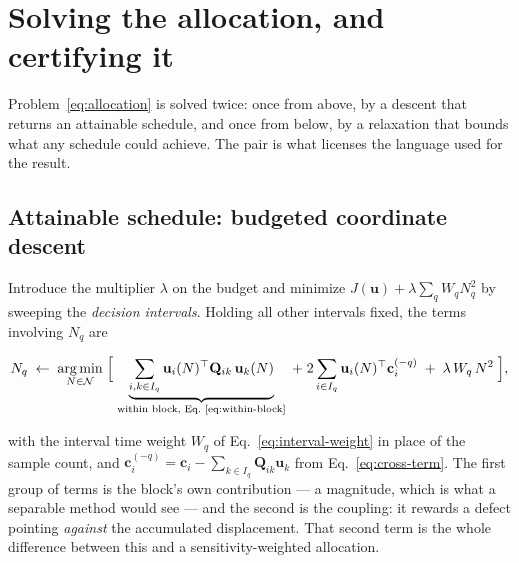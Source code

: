 \section{Solving the allocation, and certifying it}
\label{sec:algorithm}

Problem~\eqref{eq:allocation} is solved twice: once from above, by a descent
that returns an attainable schedule, and once from below, by a relaxation that
bounds what any schedule could achieve. The pair is what licenses the language
used for the result.

\subsection{Attainable schedule: budgeted coordinate descent}
\label{sec:algorithm-descent}

Introduce the multiplier $\lambda$ on the budget and minimize
$J(\mathbf u)+\lambda\sum_q W_q N_q^2$ by sweeping the \emph{decision
intervals}. Holding all other intervals fixed, the terms involving $N_q$ are

\begin{equation}
  N_q \;\leftarrow\; \operatorname*{arg\,min}_{N\in\mathcal{N}}\;
  \Bigl[\;
    \underbrace{\sum_{i,k\in I_q}\mathbf u_i(N)^{\top}\mathbf Q_{ik}\,
      \mathbf u_k(N)}_{\text{within block, Eq.~\eqref{eq:within-block}}}
    \;+\; 2\sum_{i\in I_q}\mathbf u_i(N)^{\top}\mathbf c_i^{(-q)}
    \;+\; \lambda\,W_q\,N^2
  \;\Bigr] ,
  \label{eq:coordinate-update}
\end{equation}

with the interval time weight $W_q$ of Eq.~\eqref{eq:interval-weight} in place
of the sample count, and
$\mathbf c_i^{(-q)}=\mathbf c_i-\sum_{k\in I_q}\mathbf Q_{ik}\mathbf u_k$
from Eq.~\eqref{eq:cross-term}. The first group of terms is the block's own
contribution --- a magnitude, which is what a separable method would see ---
and the second is the coupling: it rewards a defect pointing \emph{against} the
accumulated displacement. That second term is the whole difference between this
and a sensitivity-weighted allocation.

